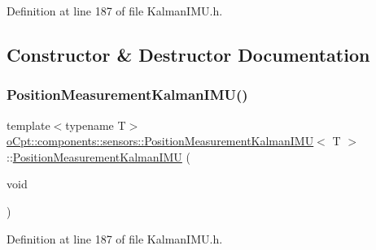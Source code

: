 Definition at line 187 of file Kalman\+I\+M\+U.\+h.



\subsection{Constructor \& Destructor Documentation}
\hypertarget{classo_cpt_1_1components_1_1sensors_1_1_position_measurement_kalman_i_m_u_acb44fed74fc170215d2ce0b872b1b06b}{}\label{classo_cpt_1_1components_1_1sensors_1_1_position_measurement_kalman_i_m_u_acb44fed74fc170215d2ce0b872b1b06b} 
\subsubsection{\texorpdfstring{Position\+Measurement\+Kalman\+I\+M\+U()}{PositionMeasurementKalmanIMU()}\hspace{0.1cm}{\footnotesize\ttfamily [1/2]}}
{\footnotesize\ttfamily template$<$typename T$>$ \\
\hyperlink{classo_cpt_1_1components_1_1sensors_1_1_position_measurement_kalman_i_m_u}{o\+Cpt\+::components\+::sensors\+::\+Position\+Measurement\+Kalman\+I\+MU}$<$ T $>$\+::\hyperlink{classo_cpt_1_1components_1_1sensors_1_1_position_measurement_kalman_i_m_u}{Position\+Measurement\+Kalman\+I\+MU} (\begin{DoxyParamCaption}\item[{void}]{ }\end{DoxyParamCaption})\hspace{0.3cm}{\ttfamily [inline]}}



Definition at line 187 of file Kalman\+I\+M\+U.\+h.

\hypertarget{classo_cpt_1_1components_1_1sensors_1_1_position_measurement_kalman_i_m_u_aa5200169110c4126060838f9dc799723}{}\label{classo_cpt_1_1components_1_1sensors_1_1_position_measurement_kalman_i_m_u_aa5200169110c4126060838f9dc799723} 
